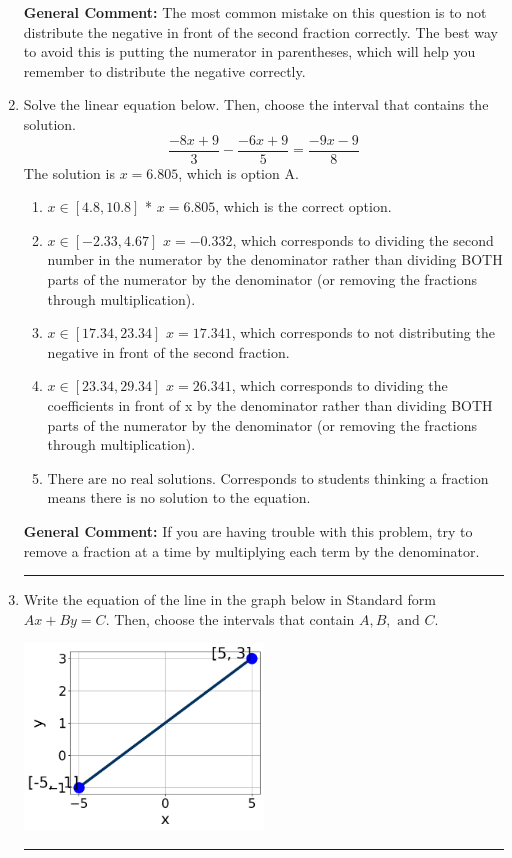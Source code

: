 \documentclass{extbook}[14pt]
\newcommand{\litem}[1]{\item #1

\rule{\textwidth}{0.4pt}}
\begin{document}
\begin{enumerate}
{\textbf{General Comment:} The most common mistake on this question is to not distribute the negative in front of the second fraction correctly. The best way to avoid this is putting the numerator in parentheses, which will help you remember to distribute the negative correctly.
}

\litem{
Solve the linear equation below. Then, choose the interval that contains the solution.
\[ \frac{-8x + 9}{3} - \frac{-6x + 9}{5} = \frac{-9x -9}{8} \]
The solution is \( x = 6.805 \), which is option A.\begin{enumerate}[label=\Alph*.]
\item \( x \in [4.8, 10.8] \)
* $x = 6.805$, which is the correct option.
\item \( x \in [-2.33, 4.67] \)
 $x = -0.332$, which corresponds to dividing the second number in the numerator by the denominator rather than dividing BOTH parts of the numerator by the denominator (or removing the fractions through multiplication).
\item \( x \in [17.34, 23.34] \)
 $x = 17.341$, which corresponds to not distributing the negative in front of the second fraction.
\item \( x \in [23.34, 29.34] \)
 $x = 26.341$, which corresponds to dividing the coefficients in front of x by the denominator rather than dividing BOTH parts of the numerator by the denominator (or removing the fractions through multiplication).
\item \( \text{There are no real solutions.} \)
Corresponds to students thinking a fraction means there is no solution to the equation.
\end{enumerate}

\textbf{General Comment:} If you are having trouble with this problem, try to remove a fraction at a time by multiplying each term by the denominator.
}
\litem{
Write the equation of the line in the graph below in Standard form $Ax+By=C$. Then, choose the intervals that contain $A, B, \text{ and } C$.

\begin{center}
    \includegraphics[width=0.5\textwidth]{../Figures/linearGraphToStandardCopyA.png}
\end{center}

}
\end{enumerate}
\end{document}

